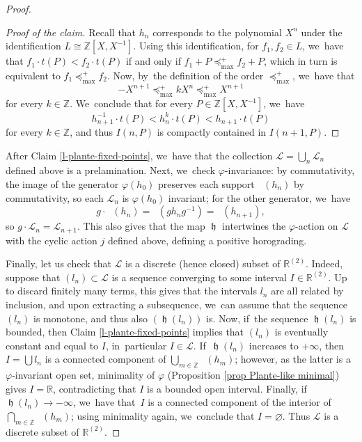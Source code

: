 \documentclass[10pt]{amsart}
\theoremstyle{definition}
\DeclareMathOperator{\hor}{\mathfrak{h}}
\DeclareMathOperator{\suppphi}{\mathsf{Supp}^\varphi}
\newcommand{\R}{\mathbb{R}}
\newcommand{\Z}{\mathbb Z}
\newcommand{\Lcal}{\mathcal{L}}
\begin{document}
\begin{proof}
\begin{proof}[Proof of the claim]
Recall that $h_n$ corresponds to the polynomial $X^n$ under the identification $L\cong \Z[X, X^{-1}]$. Using this identification, for $f_1, f_2\in L$, we~have that $f_1\cdot t(P)< f_2\cdot t(P)$ if and only if $f_1+P\preceq_{\max}^+ f_2+P$, which in turn is equivalent to $f_1\preceq_{\max}^+ f_2$. Now, by~the definition of the order $\preceq_{\max}^+$, we~have that
\[-X^{n+1} \preceq_{\max}^+ kX^n \preceq_{\max}^+ X^{n+1}
\]
for every $k\in \Z$. We~conclude that for every $P\in \Z[X, X^{-1}]$, we~have
\[h_{n+1}^{-1}\cdot t(P)< h_n^k\cdot t(P)< h_{n+1}\cdot t(P)
\]
for every $k\in \Z$, and thus ${I(n, P)}$ is compactly contained in $I(n+1, P)$.
\end{proof}

After Claim \ref{l-plante-fixed-points}, we~have that the collection $\Lcal=\bigcup_n \Lcal_n$ defined above is a prelamination. Next, we~check $\varphi$-invariance: by commutativity, the image of the generator $\varphi(h_0)$ preserves each support $\suppphi(h_n)$ by commutativity, so each $\Lcal_n$ is $\varphi(h_0)$ invariant; for the other generator, we~have
\[g\cdot \suppphi(h_n)=\suppphi(gh_ng^{-1})=\suppphi(h_{n+1}),
\]
so $g\cdot \Lcal_n=\Lcal_{n+1}$. This also gives that the map $\hor$ intertwines the $\varphi$-action on $\Lcal$ with the cyclic action $j$ defined above, defining a positive horograding.

Finally, let us check that $\Lcal$ is a discrete (hence closed) subset of $\R^{(2)}$. Indeed, suppose that $(l_n)\subset \Lcal$ is a sequence converging to some interval $I\in \R^{(2)}$. Up to discard finitely many terms, this gives that the intervals $l_n$ are all related by inclusion, and upon extracting a subsequence, we~can assume that the sequence $(l_n)$ is monotone, and thus also $(\hor(l_n))$ is. Now, if~the sequence $\hor(l_n)$ is bounded, then Claim \ref{l-plante-fixed-points} implies that $(l_n)$ is eventually constant and equal to $I$, in~particular $I\in \Lcal$. If~$\hor(l_n)$ increases to $+\infty$, then $I=\bigcup l_n$ is a connected component of $\bigcup_{m\in \Z}\suppphi(h_m)$; however, as the latter is a $\varphi$-invariant open set, minimality of $\varphi$ (Proposition \ref{prop Plante-like minimal}) gives $I=\R$, contradicting that $I$ is a bounded open interval. Finally, if~$\hor(l_n)\to -\infty$, we~have that~$I$ is a connected component of the interior of $\bigcap_{m\in \Z}\suppphi(h_m)$; using minimality again, we~conclude that $I=\varnothing$. Thus $\Lcal$ is a discrete subset of $\R^{(2)}$.
\end{proof}
\setcounter{section}{6}
\end{document}
